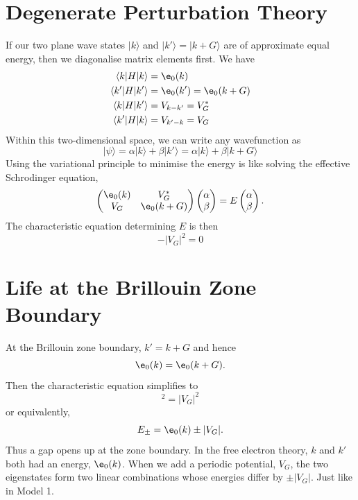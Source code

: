 \documentclass[a4paper, 11pt, normalem]{report}
\begin{document}
\section{Degenerate Perturbation Theory}
If our two plane wave states $|k\rangle$ and $|k'\rangle = |k+G\rangle$ are of approximate equal energy, then we diagonalise matrix elements first. 
We have
\begin{align}
    \langle k|H|k\rangle &= \e_0(k) \\
    \langle k'|H|k'\rangle &= \e_0(k') = \e_0(k+G) \\
    \langle k|H|k'\rangle &= V_{k-k'} = V^*_G \\
    \langle k'|H|k\rangle &= V_{k'-k} = V_G
\end{align}
Within this two-dimensional space, we can write any wavefunction as
\begin{equation}
    |\psi\rangle = \alpha|k\rangle + \beta|k'\rangle = \alpha|k\rangle + \beta|k+G\rangle
\end{equation}
Using the variational principle to minimise the energy is like solving the effective Schrodinger equation,
\begin{equation}
    \begin{pmatrix}
        \e_0(k) & V_G^* \\
        V_G & \e_0(k+G) 
    \end{pmatrix}
    \begin{pmatrix}
        \alpha \\
        \beta
    \end{pmatrix} = E
    \begin{pmatrix}
        \alpha \\
        \beta
    \end{pmatrix}.
\end{equation}
The characteristic equation determining $E$ is then
\begin{equation}
    [\e_0(k) - E][\e_0(k+G) - E] - |V_G|^2 = 0
\end{equation}

\section{Life at the Brillouin Zone Boundary}
At the Brillouin zone boundary, $k' = k+G$ and hence
\begin{equation}
    \e_0(k) = \e_0(k+G).
\end{equation}
Then the characteristic equation simplifies to
\begin{equation}
    [\e_0(k) - E]^2 = |V_G|^2
\end{equation}
or equivalently,
\begin{equation}
    E_{\pm} = \e_0(k) \pm |V_G|.
\end{equation}
Thus a gap opens up at the zone boundary. 
In the free electron theory, $k$ and $k'$ both had an energy, $\e_0(k)$. 
When we add a periodic potential, $V_G$, the two eigenstates form two linear combinations whose energies differ by $\pm |V_G|$.
Just like in Model 1.
\end{document}
